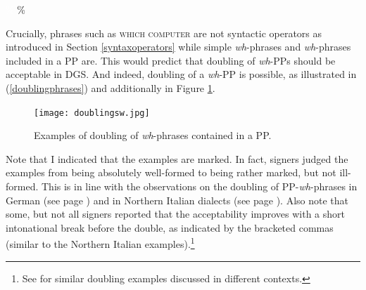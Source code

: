 
\begin{exe}
\ex\label{whphrasesinappdgs}
\begin{xlist}
\ex \textcolor{white}{\%}
%
\ex \%
%
\end{xlist}
\end{exe}


\noindent Crucially, phrases such as \textsc{which computer} are not syntactic operators as introduced in Section \ref{syntaxoperators} while simple \textit{wh}-phrases and \textit{wh}-phrases included in a PP are. This would predict that doubling of \textit{wh}-PPs should be acceptable in DGS. And indeed, doubling of a \textit{wh}-PP is possible, as illustrated in (\ref{doublingphrases}) and additionally in Figure \ref{whdoublinggg}. 

\begin{figure}[bt]
\centering
	\texttt{[image: doublingsw.jpg]}
	\caption{Examples of doubling of \textit{wh}-phrases contained in a PP.}
	\label{whdoublinggg}
\end{figure}

Note that I indicated that the examples are marked. In fact, signers judged the examples from being absolutely well-formed to being rather marked, but not ill-formed. This is in line with the observations on the doubling of PP-\textit{wh}-phrases in German (see page \pageref{whcopyinggermanb}) and in Northern Italian dialects (see page \pageref{morenorthernitalianab}). Also note that some, but not all signers reported that the acceptability improves with a short intonational break before the double, as indicated by the bracketed commas (similar to the Northern Italian examples).\footnote{ See \citet[324--325]{happ2014vork} for similar doubling examples discussed in different contexts. } 


